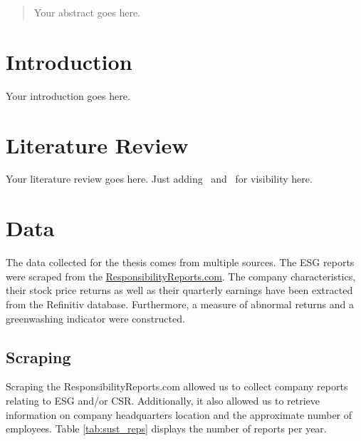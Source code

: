 \documentclass[12pt]{article}
\author{Your Name}
\date{Date of submission: \today}
\begin{document}

\pagebreak

\begin{abstract}
Your abstract goes here.
\end{abstract}
\pagebreak

\tableofcontents
\pagebreak

\section{Introduction}\label{sect:introduction}
Your introduction goes here.

\section{Literature Review}\label{sect:literature_review}
Your literature review goes here.
Just adding~\parencite{Lagasio2024} and~\parencite{Wu2020} for visibility here.
\parencite{Bingler2022}
\parencite{Bingler2024}
\parencite{Callaway2024}
\parencite{Gourier2024}
\parencite{Ilhan2023}


\section{Data}\label{sect:data}

The data collected for the thesis comes from multiple sources. The ESG reports were scraped from the \href{https://responsibilityreports.com}{ResponsibilityReports.com}. The company characteristics, their stock price returns as well as their quarterly earnings have been extracted from the Refinitiv database. Furthermore, a measure of abnormal returns and a greenwashing indicator were constructed.

\subsection{Scraping}

Scraping the ResponsibilityReports.com allowed us to collect company reports relating to ESG and/or CSR. Additionally, it also allowed us to retrieve information on company headquarters location and the approximate number of employees. Table \ref{tab:sust_reps} displays the number of reports per year.
\end{document}

